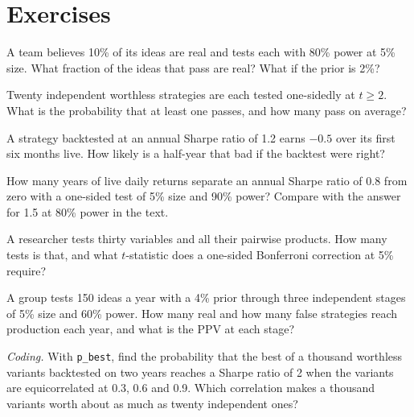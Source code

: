 \section{Exercises}

\begin{exercise}[$\star$]\label{exo:rs:the-research-process:1}
A team believes 10\% of its ideas are real and tests each with 80\% power at 5\% size. What fraction of the ideas that pass
are real? What if the prior is 2\%?
\end{exercise}

\begin{exercise}[$\star$]\label{exo:rs:the-research-process:2}
Twenty independent worthless strategies are each tested one-sidedly at $t \ge 2$. What is the probability that at least one
passes, and how many pass on average?
\end{exercise}

\begin{exercise}[$\star$]\label{exo:rs:the-research-process:3}
A strategy backtested at an annual Sharpe ratio of 1.2 earns $-0.5$ over its first six months live. How likely is a half-year
that bad if the backtest were right?
\end{exercise}

\begin{exercise}[$\star\star$]\label{exo:rs:the-research-process:4}
How many years of live daily returns separate an annual Sharpe ratio of 0.8 from zero with a one-sided test of 5\% size and
90\% power? Compare with the answer for 1.5 at 80\% power in the text.
\end{exercise}

\begin{exercise}[$\star\star$]\label{exo:rs:the-research-process:5}
A researcher tests thirty variables and all their pairwise products. How many tests is that, and what $t$-statistic does a
one-sided Bonferroni correction at 5\% require?
\end{exercise}

\begin{exercise}[$\star\star$]\label{exo:rs:the-research-process:6}
A group tests 150 ideas a year with a 4\% prior through three independent stages of 5\% size and 60\% power. How many real and
how many false strategies reach production each year, and what is the PPV at each stage?
\end{exercise}

\begin{exercise}[$\star\star\star$]\label{exo:rs:the-research-process:7}
\emph{Coding.} With \texttt{p\_best}, find the probability that the best of a thousand worthless variants backtested on two
years reaches a Sharpe ratio of 2 when the variants are equicorrelated at 0.3, 0.6 and 0.9. Which correlation makes a thousand
variants worth about as much as twenty independent ones?
\end{exercise}

